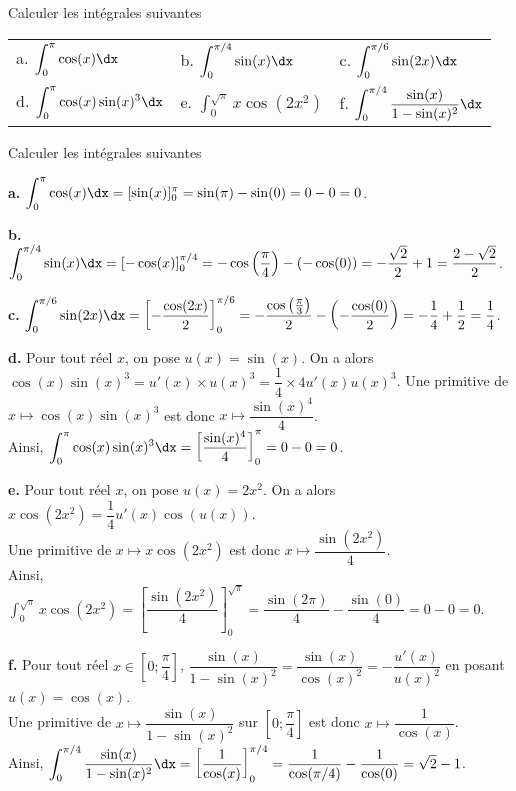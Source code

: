 \documentclass[11pt,fleqn, openany]{book} %
\begin{document}
\begin{exercise}Calculer les intégrales suivantes

\begin{tabularx}{\linewidth}{XXX}
a. $\displaystyle\int_0^{\pi} \cos(x)\dx$ & b. $\displaystyle\int_0^{\pi /4} \sin(x)\dx$ & c. $\displaystyle\int_0^{\pi / 6} \sin(2x)\dx$ \\
d. $\displaystyle\int_0^{\pi} \cos(x)\sin(x)^3\dx$ & e. $\displaystyle\int_0^{\sqrt{\pi}}x\cos(2x^2)$ & f. $\displaystyle\int_0^{\pi/4} \dfrac{\sin(x)}{1-\sin(x)^2}\dx$
\end{tabularx}

\end{exercise}


\begin{solution}Calculer les intégrales suivantes

\textbf{a.} $\displaystyle\int_0^{\pi} \cos(x)\dx = [\sin(x)]_0^{\pi}=\sin(\pi)-\sin(0)=0-0=0$.

\textbf{b.} $\displaystyle\int_0^{\pi /4} \sin(x)\dx = [-\cos(x)]_0^{\pi /4}=-\cos\left(\dfrac{\pi}{4}\right)-(-\cos(0))=-\dfrac{\sqrt{2}}{2}+1=\dfrac{2-\sqrt{2}}{2}$.

\textbf{c.} $\displaystyle\int_0^{\pi / 6} \sin(2x)\dx = \left[-\dfrac{\cos(2x)}{2}\right]_0^{\pi/6} = -\dfrac{\cos\left(\frac{\pi}{3}\right)}{2}-\left(-\dfrac{\cos(0)}{2}\right)=-\dfrac{1}{4}+\dfrac{1}{2}=\dfrac{1}{4}$.

\textbf{d.} Pour tout réel $x$, on pose $u(x)=\sin(x)$. On a alors $\cos(x)\sin(x)^3 = u'(x) \times u(x)^3 = \dfrac{1}{4} \times 4u'(x)u(x)^3$. Une primitive de $x\mapsto \cos(x)\sin(x)^3$ est donc $x\mapsto \dfrac{\sin(x)^4}{4}$. \\ Ainsi, $\displaystyle\int_0^{\pi} \cos(x)\sin(x)^3\dx = \left[\dfrac{\sin(x)^4}{4}\right]_0^{\pi}=0-0=0$.

\textbf{e.} Pour tout réel $x$, on pose $u(x)=2x^2$. On a alors $x\cos(2x^2) = \dfrac{1}{4}u'(x)\cos(u(x))$. \\Une primitive de $x\mapsto x\cos(2x^2)$ est donc $x\mapsto \dfrac{\sin(2x^2)}{4}$. \\ Ainsi, $\displaystyle\int_0^{\sqrt{\pi}}x\cos(2x^2) = \left[\dfrac{\sin(2x^2)}{4}\right]_0^{\sqrt{\pi}}= \dfrac{\sin(2\pi)}{4}-\dfrac{\sin(0)}{4}=0-0=0$.

\textbf{f.} Pour tout réel $x\in \left[0;\dfrac{\pi}{4}\right]$, $\dfrac{\sin(x)}{1-\sin(x)^2}=\dfrac{\sin(x)}{\cos(x)^2} = -\dfrac{u'(x)}{u(x)^2}$ en posant $u(x)=\cos(x)$. \\ Une primitive de $x\mapsto \dfrac{\sin(x)}{1-\sin(x)^2}$ sur $\left[0;\dfrac{\pi}{4}\right]$ est donc $x\mapsto \dfrac{1}{\cos(x)}$.\\ Ainsi, $\displaystyle\int_0^{\pi/4} \dfrac{\sin(x)}{1-\sin(x)^2}\dx=\left[\dfrac{1}{\cos(x)}\right]_0^{\pi/4}=\dfrac{1}{\cos(\pi/4)}-\dfrac{1}{\cos(0)}=\sqrt{2}-1$.

\end{solution}
\end{document}
